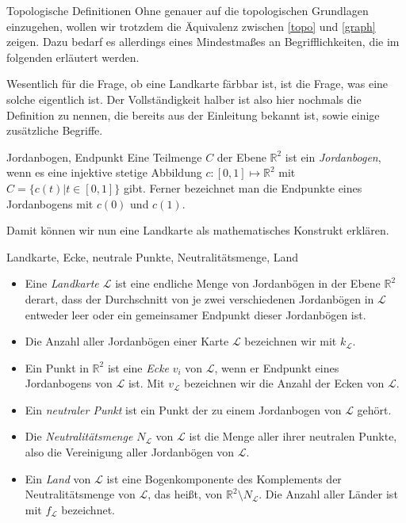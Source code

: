 \begin{section}{Topologische Definitionen}
 Ohne genauer auf die topologischen Grundlagen einzugehen, wollen wir trotzdem die Äquivalenz zwischen \ref{topo} und \ref{graph} zeigen. Dazu bedarf es allerdings eines Mindestmaßes an Begrifflichkeiten, die im folgenden erläutert werden.
 
 Wesentlich für die Frage, ob eine Landkarte färbbar ist, ist die Frage, was eine solche eigentlich ist. Der Vollständigkeit halber ist also hier nochmals die Definition zu nennen, die bereits aus der Einleitung bekannt ist, sowie einige zusätzliche Begriffe.
 
 \begin{definition}{Jordanbogen, Endpunkt}
  Eine Teilmenge $C$ der Ebene $\mathbb{R}^2$ ist ein \textit{Jordanbogen}, wenn es eine injektive stetige Abbildung $c:[0,1] \mapsto \mathbb{R}^2$ mit $C = \{c(t)|t\in [0,1]\}$ gibt. Ferner bezeichnet man die Endpunkte eines Jordanbogens mit $c(0)$ und $c(1)$.
 \end{definition}
 
 Damit können wir nun eine Landkarte als mathematisches Konstrukt erklären.
 
 \begin{definition}{Landkarte, Ecke, neutrale Punkte, Neutralitätsmenge, Land}
  \-\ 
  \begin{itemize}
    \item Eine \textit{Landkarte $\mathcal{L}$} ist eine endliche Menge von Jordanbögen in der Ebene $\mathbb{R}^2$ derart, dass der Durchschnitt von je zwei verschiedenen Jordanbögen in $\mathcal{L}$ entweder leer oder ein gemeinsamer Endpunkt dieser Jordanbögen ist.
    \item Die Anzahl aller Jordanbögen einer Karte $\mathcal{L}$ bezeichnen wir mit $k_\mathcal{L}$.
    \item Ein Punkt in $\mathbb{R}^2$ ist eine \textit{Ecke} $v_i$ von $\mathcal{L}$, wenn er Endpunkt eines Jordanbogens von $\mathcal{L}$ ist. Mit $v_\mathcal{L}$ bezeichnen wir die Anzahl der Ecken von $\mathcal{L}$.
    \item Ein \textit{neutraler Punkt} ist ein Punkt der zu einem Jordanbogen von $\mathcal{L}$ gehört.
    \item Die \textit{Neutralitätsmenge $N_{\mathcal{L}}$} von $\mathcal{L}$ ist die Menge aller ihrer neutralen Punkte, also die Vereinigung aller Jordanbögen von $\mathcal{L}$. 
    \item Ein \textit{Land} von $\mathcal{L}$ ist eine Bogenkomponente des Komplements der Neutralitätsmenge von $\mathcal{L}$, das heißt, von $\mathbb{R}^2 \setminus N_{\mathcal{L}}$. Die Anzahl aller Länder ist mit $f_\mathcal{L}$ bezeichnet.
  \end{itemize}
 \end{definition}
 

\end{section}

